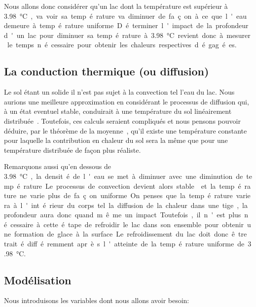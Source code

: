 \documentclass[12pt]{article}
\newcommand\critical{\SI{3.98}\celsius}
\numberwithin{figure}{section}
\begin{document}
Nous allons donc consid\'erer qu'un lac dont la temp\'erature est sup\'erieur \`a \critical, va voir
sa temp\'erature va diminuer de fa\c con \`a ce que l'eau demeure \`a temp\'erature uniforme.
D\'eterminer l'impact de la profondeur d'un lac pour diminuer sa temp\'erature \`a \critical~revient
donc \`a mesurer le temps n\'ecessaire pour obtenir les chaleurs respectives d\'egag\'ees.

\subsection{La conduction thermique (ou diffusion)}\label{Conduc}

Le sol \'etant un solide il n'est pas sujet \`a la convection tel l'eau du lac. Nous aurions une
meilleure approximation en consid\'erant le processus de diffusion qui, \`a un \'etat eventuel
stable, conduirait \`a une temp\'erature du sol lin\'eairement distribu\'ee~\cite{TempLinear}.
Toutefois, ces calculs seraient compliqu\'es et nous pensons pouvoir d\'eduire, par le th\'eor\`eme
de la moyenne~\cite{AvgValue}, qu'il existe une temp\'erature constante pour laquelle la
contribution en chaleur du sol sera la m\^eme que pour une temp\'erature distribu\'ee de fa\c con
plus r\'ealiste.

Remarquons aussi qu'en dessous de \critical, la densit\'e de l'eau se met \`a diminuer avec une
diminution de temp\'erature. Le processus de convection devient alors stable~\cite{HydroStab} et la
temp\'erature ne varie plus de fa\c con uniforme. On penses que la temp\'erature variera \`a
l'int\'erieur du corps tel la diffusion de la chaleur dans une tige, la profondeur aura donc quand
m\^eme un impact. Toutefois, il n'est plus n\'ecessaire \`a cette \'etape de refroidir le lac dans
son ensemble pour obtenir une formation de glace \`a la surface. Le refroidissement du lac doit donc
\^etre trait\'e diff\'eremment apr\`es l'atteinte de la temp\'erature uniforme de \critical.

\subsection{Mod\'elisation}

Nous introduisons les variables dont nous allons avoir besoin:
\end{document}
